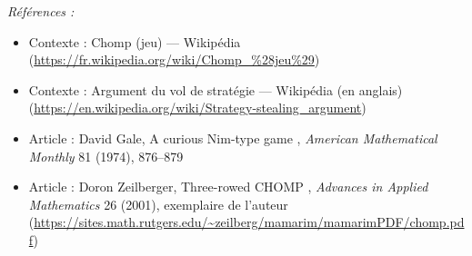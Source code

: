 \documentclass[11pt]{article}
\newenvironment{refs}{\par\small\noindent\emph{Références :}\begin{itemize}\setlength\itemsep{0pt}}{\end{itemize}\normalsize}
\begin{document}
\begin{refs}
\item Contexte : Chomp (jeu) --- Wikipédia (\url{https://fr.wikipedia.org/wiki/Chomp_%28jeu%29})
\item Contexte : Argument du vol de stratégie --- Wikipédia (en anglais) (\url{https://en.wikipedia.org/wiki/Strategy-stealing_argument})
\item Article : David Gale, \og{} A curious Nim-type game \fg{}, \textit{American Mathematical Monthly} 81 (1974), 876--879
\item Article : Doron Zeilberger, \og{} Three-rowed CHOMP \fg{}, \textit{Advances in Applied Mathematics} 26 (2001), exemplaire de l'auteur (\url{https://sites.math.rutgers.edu/~zeilberg/mamarim/mamarimPDF/chomp.pdf})
\end{refs}

\bigskip
\end{document}
